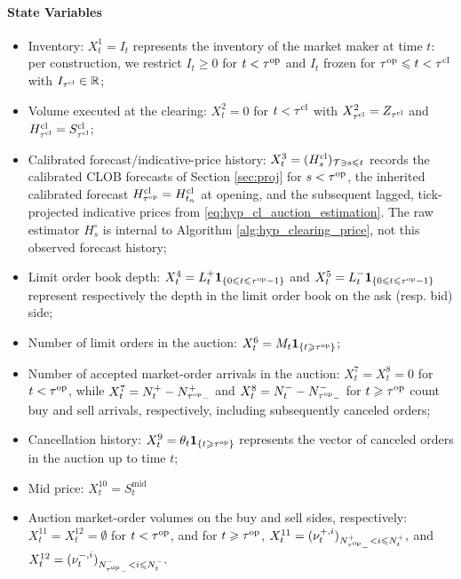 \documentclass[11pt]{article}
\begin{document}
\paragraph{State Variables}
\begin{itemize}
    \item Inventory: $X_t^1 = I_t$ represents the inventory of the market maker at time $t$: per construction, we restrict $I_t \geqslant 0$ for $t< \tau^{\mathrm{op}}$ and $I_t$ frozen for $\tau^{\mathrm{op}}\leqslant t<\tau^{\mathrm{cl}}$ with $I_{\tau^{\mathrm{cl}}}\in \mathbb{R}$;
    \item Volume executed at the clearing: $X_t^2 =0$ for $t<\tau^{\mathrm{cl}}$ with $X_{\tau^{\mathrm{cl}}}^2=Z_{\tau^{\mathrm{cl}}}$ and $H_{\tau^{\mathrm{cl}}}^{\mathrm{cl}} = S_{\tau^{\mathrm{cl}}}^{\mathrm{cl}}$; 
    \item {Calibrated forecast/indicative-price history: $X_t^3=(H_s^{\mathrm{cl}})_{\mathcal T\ni s\leqslant t}$ records the calibrated CLOB forecasts of Section \ref{sec:proj} for $s<\tau^{\mathrm{op}}$, the inherited calibrated forecast $H_{\tau^{\mathrm{op}}}^{\mathrm{cl}}=H_{t_n}^{\mathrm{cl}}$ at opening, and the subsequent lagged, {tick-projected} indicative prices from \eqref{eq:hyp_cl_auction_estimation}. The raw estimator $H_s^\circ$ is internal to Algorithm \ref{alg:hyp_clearing_price}, not this observed forecast history;}
    \item Limit order book depth: $X_t^4 = L_t^+ \mathbf{1}_{\{0 \leqslant t \leqslant {\tau^{\mathrm{op}}}-1\}}$ and $X_t^5 = L_t^- \mathbf{1}_{\{0 \leqslant t \leqslant {\tau^{\mathrm{op}}}-1\}}$ represent respectively the depth in the limit order book on the ask (resp. bid) side;
    \item Number of limit orders in the auction: $X_t^6 = M_t\mathbf{1}_{\{t \geqslant  \tau^{\mathrm{op}}\}}$;
    \item {Number of accepted market-order arrivals in the auction: $X_t^7=X_t^8=0$ for $t<\tau^{\mathrm{op}}$, while $X_t^7=N_t^+-N_{{\tau^{\mathrm{op}}}_-}^+$ and $X_t^8=N_t^--N_{{\tau^{\mathrm{op}}}_-}^-$ for $t\geqslant\tau^{\mathrm{op}}$ count buy and sell arrivals, respectively, including subsequently canceled orders;}
    \item Cancellation history: $X_t^9 = \theta_t \mathbf{1}_{\{t \geqslant  \tau^{\mathrm{op}}\}}$ represents the vector of canceled orders in the auction up to time $t$;
    \item Mid price: $X_t^{10} = S_t^\mathrm{mid}$
    \item Auction market-order volumes on the buy and sell sides, respectively: $X_t^{11}=X_t^{12}=\emptyset$ for $t<\tau^{\mathrm{op}}$, and for $t\geqslant\tau^{\mathrm{op}}$, $X_t^{11}=(\nu_t^{+,i})_{N_{{\tau^{\mathrm{op}}}_-}^+<i\leqslant N_t^+},$ and $X_t^{12}=(\nu_t^{-,i})_{N_{{\tau^{\mathrm{op}}}_-}^-<i\leqslant N_t^-}.$

\end{itemize}
\end{document}

